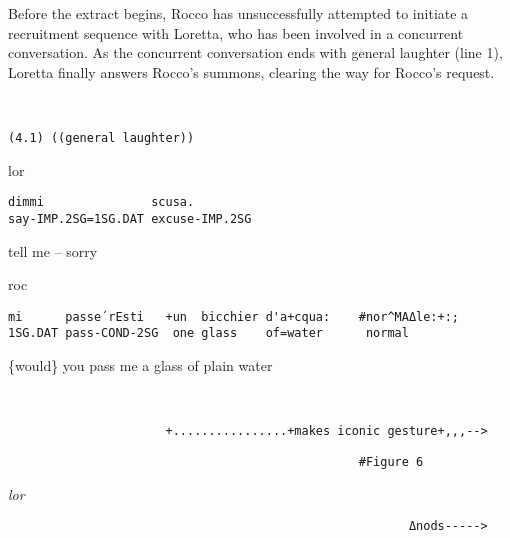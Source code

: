 \documentclass[output=paper,modfonts]{langscibook}
\begin{document}
Before the extract begins, Rocco has unsuccessfully attempted to initiate a recruitment sequence with Loretta, who has been involved in a concurrent conversation. As the concurrent conversation ends with general laughter (line 1), Loretta finally answers Rocco's summons, clearing the way for Rocco's request.

\vspace{2mm}
%
\begin{transbox}{1}{~}
\begin{verbatim}
(4.1) ((general laughter))
\end{verbatim}
\end{transbox}\vspace{1mm}
%
\begin{transbox}{2}{lor}
\begin{verbatim}
dimmi               scusa.
say-IMP.2SG=1SG.DAT excuse-IMP.2SG
\end{verbatim}
tell me -- sorry
\end{transbox}\vspace{1mm}
%
\vspace{-0.5mm}
%
\begin{mdframednoverticalspace}[style=firstfoc]
\begin{transbox}{4}{roc}
\begin{verbatim}
mi      passe´rEsti   +un  bicchier d'a+cqua:    #nor^MAΔle:+:;
1SG.DAT pass-COND-2SG  one glass    of=water      normal
\end{verbatim}
\{would\} you pass me a glass of plain water
\end{transbox}
\end{mdframednoverticalspace}\vspace{0.5mm}
%
\begin{transbox}{5}{~}
\begin{verbatim}
                      +................+makes iconic gesture+,,,-->
\end{verbatim}
\end{transbox}
%
\begin{transbox}{6}{\fig}
\begin{verbatim}
                                                 #Figure 6
\end{verbatim}
\end{transbox}\vspace{-0.75mm}
%
\begin{mdframednoverticalspace}[style=secondfoc]
\begin{transbox}{7}{\textit{lor}}
\begin{verbatim}
                                                        Δnods----->
\end{verbatim}
\end{transbox}
\end{mdframednoverticalspace}
\end{document}

